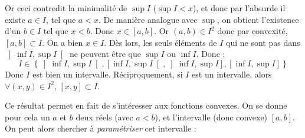\documentclass[a4paper,french,bookmarks]{report}
\begin{document}
\begin{nproof}
    \begin{enumerate}
        \itt Or ceci contredit la minimalité de $\sup I$ ($\sup I < x$), et donc par l'absurde il existe $a \in I$, tel que $a < x$. De manière analogue avec $\sup$, on obtient l'existence d'un $b \in I$ tel que $x < b$. Donc $x \in [a, b]$. Or $(a, b) \in I^2$ donc par convexité, $[a, b] \subset I$. On a bien $x \in I$. Dès lors, les seuls éléments de $I$ qui ne sont pas dans $\left]\inf I, \sup I\right[$ ne peuvent être que $\sup I$ ou $\inf I$. Donc :
        \[ I \in \left\{\left]\inf I, \sup I\right[, \left[\inf I, \sup I\right[, \left]\inf I, \sup I\right], \left[\inf I, \sup I\right]\right\}\]
        \itt Donc $I$ est bien un intervalle. Réciproquement, si $I$ est un intervalle, alors $\forall (x, y) \in I^2$, $[x, y] \subset I$.
    \end{enumerate}
\end{nproof}

Ce résultat permet en fait de s'intéresser aux fonctions convexes. On se donne pour cela un $a$ et $b$ deux réels (avec $a < b$), et l'intervalle (donc convexe) $[a, b]$. On peut alors chercher à \textit{paramétriser} cet intervalle :\\
\end{document}
